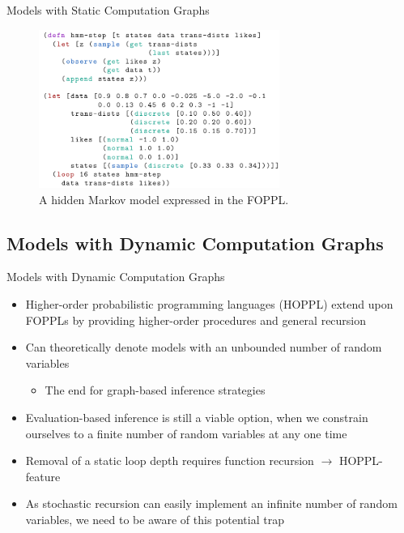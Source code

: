 \documentclass[AERbeamer%
              ,optEnglish%
              ,optBiber%
              ,optBibstyleAlphabetic%
              ,optBeamerClassicFormat%
              ]{AERlatex}%
\begin{document}
\begin{frame}[c]{Models with Static Computation Graphs}
    \centering
    \begin{figure}
        \centering
        \includegraphics[width=0.7\textwidth]{FOPPLHiddenMarkovModel.png}
        \caption{A hidden Markov model expressed in the FOPPL.}
    \end{figure}
\end{frame}



\subsection{Models with Dynamic Computation Graphs}

\begin{frame}[c]{Models with Dynamic Computation Graphs}
    \centering
    \begin{itemize}
        \item Higher-order probabilistic programming languages (HOPPL) extend upon FOPPLs by providing
              higher-order procedures and general recursion
        \item Can theoretically denote models with an unbounded number of random variables
        \begin{itemize}
            \item The end for graph-based inference strategies
        \end{itemize}
        \item Evaluation-based inference is still a viable option, when we constrain ourselves to a
              finite number of random variables at any one time
        \item Removal of a static loop depth requires function recursion $\rightarrow$ HOPPL-feature
        \item As stochastic recursion can easily implement an infinite number of random variables, we need
              to be aware of this potential trap
    \end{itemize}
\end{frame}
\end{document}
